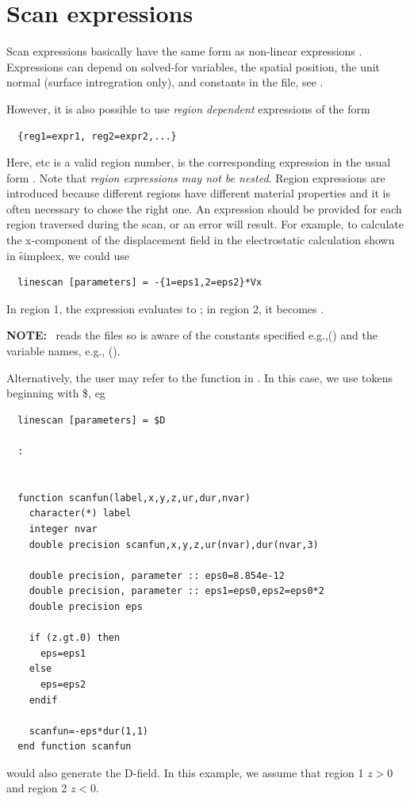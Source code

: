 \documentclass[a4paper,twoside,11pt]{book}
\begin{document}
\section{Scan expressions}
\label{scanexpr}
Scan expressions basically have the same form as non-linear
expressions . Expressions can depend on solved-for
variables, the spatial position, the unit normal (surface intregration
only), and constants in the  file, see .

However, it is also possible to use \emph{region dependent}
expressions of the form
\begin{verbatim}
  {reg1=expr1, reg2=expr2,...}
\end{verbatim}

Here,  etc is a valid region number,  is the
corresponding expression in the usual form . Note
that \emph{region expressions may not be nested}. Region expressions
are introduced because different regions have different material
properties and it is often necessary to chose the right one. An expression should be provided for each region traversed
during the scan, or an error will result. For example, to calculate
the x-component of the displacement field in the electrostatic calculation
shown in \f{simpleex}, we could use
\begin{verbatim}
  linescan [parameters] = -{1=eps1,2=eps2}*Vx
\end{verbatim}
In region 1, the expression evaluates to ; in region 2,
it becomes .

\textbf{NOTE:} \zpp\ reads the files 
so is aware of the constants specified e.g.,() and the
variable names, e.g., ().

Alternatively, the user may refer to the function  in
. In this case, we use tokens beginning with \$, eg

\begin{verbatim}
  linescan [parameters] = $D

  :


  function scanfun(label,x,y,z,ur,dur,nvar)
    character(*) label
    integer nvar
    double precision scanfun,x,y,z,ur(nvar),dur(nvar,3)

    double precision, parameter :: eps0=8.854e-12
    double precision, parameter :: eps1=eps0,eps2=eps0*2
    double precision eps

    if (z.gt.0) then
      eps=eps1
    else
      eps=eps2
    endif

    scanfun=-eps*dur(1,1)
  end function scanfun
\end{verbatim}
would also generate the D-field. In this example, we assume that region 1 $z>0$
and region 2 $z<0$.
\end{document}
